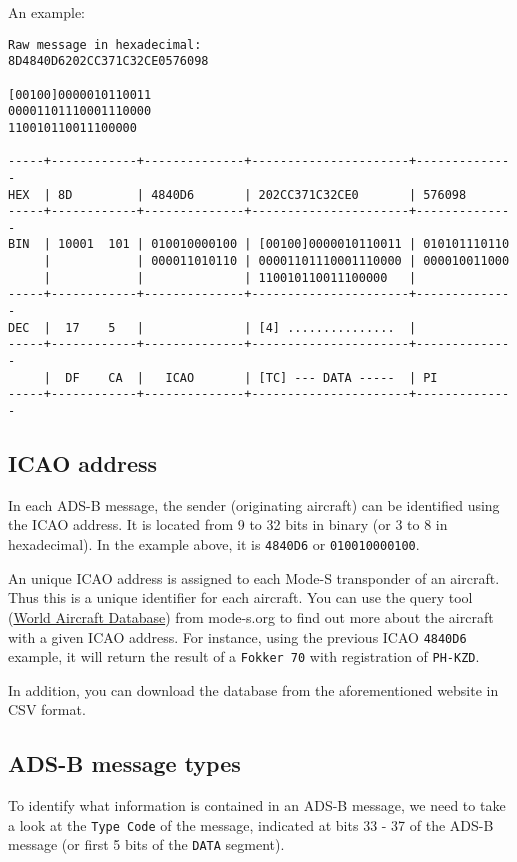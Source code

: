 An example:

\begin{verbatim}
Raw message in hexadecimal:
8D4840D6202CC371C32CE0576098

[00100]0000010110011
00001101110001110000
110010110011100000

-----+------------+--------------+----------------------+--------------
HEX  | 8D         | 4840D6       | 202CC371C32CE0       | 576098
-----+------------+--------------+----------------------+--------------
BIN  | 10001  101 | 010010000100 | [00100]0000010110011 | 010101110110
     |            | 000011010110 | 00001101110001110000 | 000010011000
     |            |              | 110010110011100000   |
-----+------------+--------------+----------------------+--------------
DEC  |  17    5   |              | [4] ...............  |
-----+------------+--------------+----------------------+--------------
     |  DF    CA  |   ICAO       | [TC] --- DATA -----  | PI
-----+------------+--------------+----------------------+--------------
\end{verbatim}

\subsection{ICAO address}\label{icao-address}

In each ADS-B message, the sender (originating aircraft) can be identified using the ICAO address. It is located from 9 to 32 bits in binary (or 3 to 8 in hexadecimal). In the example above, it is \texttt{4840D6} or \texttt{010010000100}.

An unique ICAO address is assigned to each Mode-S transponder of an aircraft. Thus this is a unique identifier for each aircraft. You can use the query tool (\href{https://junzis.com/adb/}{World Aircraft Database}) from mode-s.org to find out more about the aircraft with a given ICAO address. For instance, using the previous ICAO \texttt{4840D6} example, it will return the result of a \texttt{Fokker\ 70} with registration of \texttt{PH-KZD}.

In addition, you can download the database from the aforementioned website in CSV format.

\subsection{ADS-B message types}\label{ads-b-message-types}

To identify what information is contained in an ADS-B message, we need to take a look at the \texttt{Type\ Code} of the message, indicated at bits 33 - 37 of the ADS-B message (or first 5 bits of the \texttt{DATA} segment).

